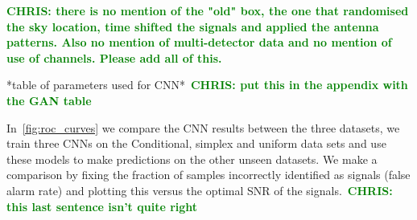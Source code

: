 \documentclass[12pt]{iopart}
\newcommand{\chris}[1]{\textbf{\textcolor{green}{CHRIS: #1}}}
\begin{document}
\chris{there is no mention of the "old" box, the one that randomised the sky
location, time shifted the signals and applied the antenna patterns. Also no
mention of multi-detector data and no mention of use of channels. Please add
all of this. }

*table of parameters used for CNN*~\chris{put this in the appendix with the
GAN table}

In~\cref{fig:roc_curves} we compare the \ac{CNN} results between the three
datasets, we train three \acp{CNN} on the Conditional, simplex and uniform data sets
and use these models to make predictions on the other unseen datasets. We make
a comparison by fixing the fraction of samples incorrectly identified as
signals (false alarm rate) and plotting this versus the optimal SNR of the
signals.~\chris{this last sentence isn't quite right} 
\end{document}
